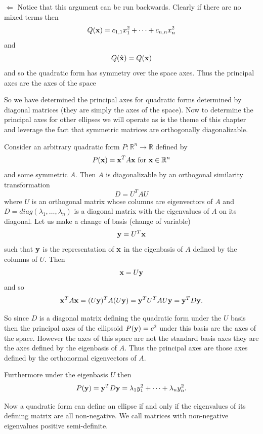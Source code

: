 \documentclass{book}
\begin{document}
{$\Leftarrow$ Notice that this argument can be run backwards. Clearly if there are no mixed terms then
$$
Q({\bf x})=c_{1,1}x_1^2+\cdots+c_{n,n}x_n^2
$$
and
$$
Q(\hat{\bf x})=Q({\bf x})
$$
and so the quadratic form has symmetry over the space axes. Thus the principal axes are the axes of the space
}

So we have determined the principal axes for quadratic forms determined by diagonal matrices (they are simply the axes of the space). Now to determine the principal axes for other ellipses we will operate as is the theme of this chapter and leverage the fact that symmetric matrices are orthogonally diagonalizable.

Consider an arbitrary quadratic form $P:\mathbb{R}^n\rightarrow\mathbb{R}$ defined by 
$$
P({\bf x})={\bf x}^TA{\bf x}\text{ for }{\bf x}\in\mathbb{R}^n
$$
and some symmetric $A$. Then $A$ is diagonalizable by an orthogonal similarity transformation
$$
D=U^TAU
$$
where $U$ is an orthogonal matrix whose columns are eigenvectors of $A$ and $D=diag(\lambda_1,\ldots,\lambda_n)$ is a diagonal matrix with the eigenvalues of $A$ on its diagonal. Let us make a change of basis (change of variable)
$$
{\bf y}=U^T{\bf x}
$$
such that ${\bf y}$ is the representation of ${\bf x}$ in the eigenbasis of $A$ defined by the columns of $U$. Then 
$$
{\bf x}=U{\bf y}
$$
and so 
$$
{\bf x}^TA{\bf x}=(U{\bf y})^TA(U{\bf y})={\bf y}^TU^TAU{\bf y}={\bf y}^TD{\bf y}.
$$

So since $D$ is a diagonal matrix defining the quadratic form under the $U$ basis then the principal axes of the ellipsoid $P({\bf y})=c^2$ under this basis are the axes of the space. However the axes of this space are not the standard basis axes they are the axes defined by the eigenbasis of $A$. Thus the principal axes are those axes defined by the orthonormal eigenvectors of $A$. 

Furthermore under the eigenbasis $U$ then
$$
P({\bf y})={\bf y}^TD{\bf y}=\lambda_1y_1^2+\cdots+\lambda_ny_n^2.
$$

Now a quadratic form can define an ellipse if and only if the eigenvalues of its defining matrix are all non-negative. We call matrices with non-negative eigenvalues positive semi-definite.

\end{document}
